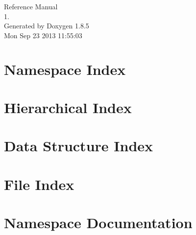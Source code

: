 \documentclass[twoside]{book}
\newcommand{\clearemptydoublepage}{%
  \newpage{\pagestyle{empty}\cleardoublepage}%
}
\begin{document}
\hypersetup{pageanchor=false}
\begin{titlepage}
\vspace*{7cm}
\begin{center}%
{\Large Reference Manual\\[1ex]\large 1. }\\
\vspace*{1cm}
{\large Generated by Doxygen 1.8.5}\\
\vspace*{0.5cm}
{\small Mon Sep 23 2013 11:55:03}\\
\end{center}
\end{titlepage}
\clearemptydoublepage
\tableofcontents
\clearemptydoublepage
{}
\hypersetup{pageanchor=true}

\chapter{Namespace Index}

\chapter{Hierarchical Index}

\chapter{Data Structure Index}

\chapter{File Index}

\chapter{Namespace Documentation}

\end{document}
